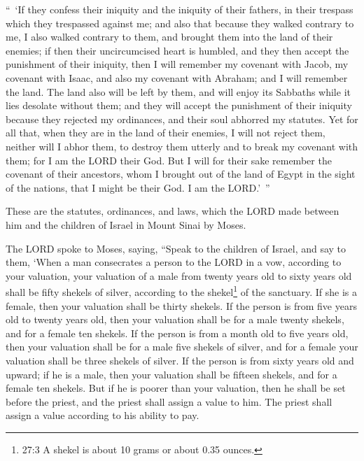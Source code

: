 \myverse{}“ ‘If they confess their iniquity and the iniquity of their fathers,
in their trespass which they trespassed against me; and also that because they walked contrary to me,
\myverse{}I also walked contrary to them, and brought them into the land of their enemies;
if then their uncircumcised heart is humbled, and they then accept the punishment of their iniquity,
\myverse{}then I will remember my covenant with Jacob, my covenant with Isaac, and
also my covenant with Abraham; and I will remember the land.
\myverse{}The land also will be left by them, and will enjoy its Sabbaths while it
lies desolate without them; and they will accept the punishment of their iniquity because they rejected
my ordinances, and their soul abhorred my statutes.
\myverse{}Yet for all that, when they are in the land of their enemies, I will not
reject them, neither will I abhor them, to destroy them utterly and to break my covenant with them; for
I am the LORD their God.
\myverse{}But I will for their sake remember the covenant of their ancestors, whom
I brought out of the land of Egypt in the sight of the nations, that I might be their God. I am the LORD.’ ”


\myverse{}These are the statutes, ordinances, and laws, which the LORD
made between him and the children of Israel in Mount Sinai by Moses.


\mychapter{} \myverse*{}The LORD spoke to Moses, saying,
\myverse{}“Speak to the children of Israel, and say to them, ‘When a man consecrates
a person to the LORD in a vow, according to your valuation,
\myverse{}your valuation of a male from twenty years old to sixty years old shall be
fifty shekels of silver, according to the shekel\footnote{27:3 A shekel is about 10 grams or about 0.35 ounces.} of the sanctuary.
\myverse{}If she is a female, then your valuation shall be thirty shekels.
\myverse{}If the person is from five years old to twenty years old, then your valuation
shall be for a male twenty shekels, and for a female ten shekels.
\myverse{}If the person is from a month old to five years old, then your valuation shall
be for a male five shekels of silver, and for a female your valuation shall be three shekels of silver.
\myverse{}If the person is from sixty years old and upward; if he is a male, then your
valuation shall be fifteen shekels, and for a female ten shekels.
\myverse{}But if he is poorer than your valuation, then he shall be set before the priest,
and the priest shall assign a value to him. The priest shall assign a value according to his ability to
pay.


